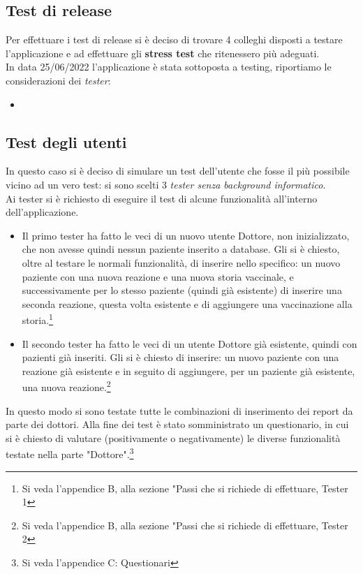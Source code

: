 \documentclass[11pt]{article}
\begin{document}
    \newpage
        \subsection{Test di release}
        Per effettuare i test di release si è deciso di trovare 4 colleghi disposti a testare l'applicazione e ad effettuare gli \textbf{stress test} che ritenessero più adeguati.\\
        In data 25/06/2022 l'applicazione è stata sottoposta a testing, riportiamo le considerazioni dei \textit{tester}:
            \begin{itemize}
                \item 
            \end{itemize}

    \newpage
        \subsection{Test degli utenti}
        In questo caso si è deciso di simulare un test dell'utente che fosse il più possibile vicino ad un vero test: si sono scelti 3 \textit{tester senza background informatico}.\\
        Ai tester si è richiesto di eseguire il test di alcune funzionalità all'interno dell'applicazione.
            \begin{itemize}
                \item Il primo tester ha fatto le veci di un nuovo utente Dottore, non inizializzato, che non avesse quindi nessun paziente inserito a database. Gli si è chiesto, oltre al testare le normali funzionalità, di inserire nello specifico: un nuovo paziente con una nuova reazione e una nuova storia vaccinale, e successivamente per lo stesso paziente (quindi già esistente)
                di inserire una seconda reazione, questa volta esistente e di aggiungere una vaccinazione alla storia.\footnote{Si veda l'appendice B, alla sezione "Passi che si richiede di effettuare, Tester 1}
                \item Il secondo tester ha fatto le veci di un utente Dottore già esistente, quindi con pazienti già inseriti. Gli si è chiesto di inserire: un nuovo paziente con una reazione già esistente e in seguito di aggiungere, per un paziente già esistente, una nuova reazione.\footnote{Si veda l'appendice B, alla sezione "Passi che si richiede di effettuare, Tester 2}
            \end{itemize}
        In questo modo si sono testate tutte le combinazioni di inserimento dei report da parte dei dottori. Alla fine dei test è stato somministrato un questionario, in cui si è chiesto di valutare (positivamente o negativamente) le diverse funzionalità testate nella parte "Dottore".\footnote{Si veda l'appendice C: Questionari}
\end{document}
